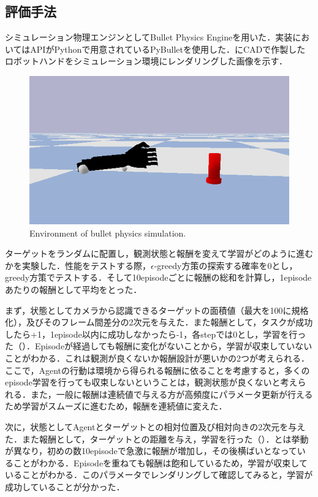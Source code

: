 \subsection{評価手法}
シミュレーション物理エンジンとしてBullet Physics Engineを用いた．実装においてはAPIがPythonで用意されているPyBulletを使用した．にCADで作製したロボットハンドをシミュレーション環境にレンダリングした画像を示す．

\begin{figure}[H]
    \centering
    \includegraphics[width=0.7\linewidth]{figure/chapter3/bullet_demo}
    \caption{Environment of bullet physics simulation.}
    \label{fig:1号機simu}
\end{figure}


ターゲットをランダムに配置し，観測状態と報酬を変えて学習がどのように進むかを実験した．性能をテストする際，$\epsilon$-greedy方策の探索する確率を0とし，greedy方策でテストする．そして10episodeごとに報酬の総和を計算し，1episodeあたりの報酬として平均をとった．

まず，状態としてカメラから認識できるターゲットの面積値（最大を100に規格化），及びそのフレーム間差分の2次元を与えた．また報酬として，タスクが成功したら+1，1episode以内に成功しなかったら-1，各stepでは0とし，学習を行った（）．Episodeが経過しても報酬に変化がないことから，学習が収束していないことがわかる．これは観測が良くないか報酬設計が悪いかの2つが考えられる．ここで，Agentの行動は環境から得られる報酬に依ることを考慮すると，多くのepisode学習を行っても収束しないということは，観測状態が良くないと考えられる．また，一般に報酬は連続値で与える方が高頻度にパラメータ更新が行えるため学習がスムーズに進むため，報酬を連続値に変えた．

次に，状態としてAgentとターゲットとの相対位置及び相対向きの2次元を与えた．また報酬として，ターゲットとの距離を与え，学習を行った（）．とは挙動が異なり，初めの数10episodeで急激に報酬が増加し，その後横ばいとなっていることがわかる．Episodeを重ねても報酬は飽和しているため，学習が収束していることがわかる．このパラメータでレンダリングして確認してみると，学習が成功していることが分かった．

